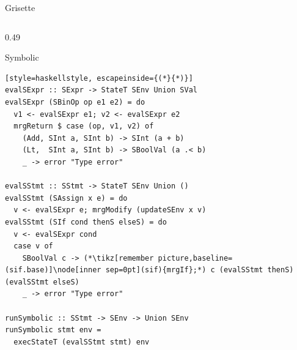 \documentclass[aspectratio=169]{beamer}
\begin{document}
\begin{frame}[fragile]{Grisette}
\begin{columns}[T,onlytextwidth]
\begin{column}{0.49\textwidth}
\begin{block}{\centering Symbolic}
\begin{lstlisting}[style=haskellstyle, escapeinside={(*}{*)}]
evalSExpr :: SExpr -> StateT SEnv Union SVal
evalSExpr (SBinOp op e1 e2) = do
  v1 <- evalSExpr e1; v2 <- evalSExpr e2
  mrgReturn $ case (op, v1, v2) of
    (Add, SInt a, SInt b) -> SInt (a + b)
    (Lt,  SInt a, SInt b) -> SBoolVal (a .< b)
    _ -> error "Type error"

evalSStmt :: SStmt -> StateT SEnv Union ()
evalSStmt (SAssign x e) = do
  v <- evalSExpr e; mrgModify (updateSEnv x v)
evalSStmt (SIf cond thenS elseS) = do
  v <- evalSExpr cond
  case v of
    SBoolVal c -> (*\tikz[remember picture,baseline=(sif.base)]\node[inner sep=0pt](sif){mrgIf};*) c (evalSStmt thenS) (evalSStmt elseS)
    _ -> error "Type error"

runSymbolic :: SStmt -> SEnv -> Union SEnv
runSymbolic stmt env =
  execStateT (evalSStmt stmt) env
\end{lstlisting}
\end{block}
\end{column}

\end{columns}
\end{frame}
\end{document}
